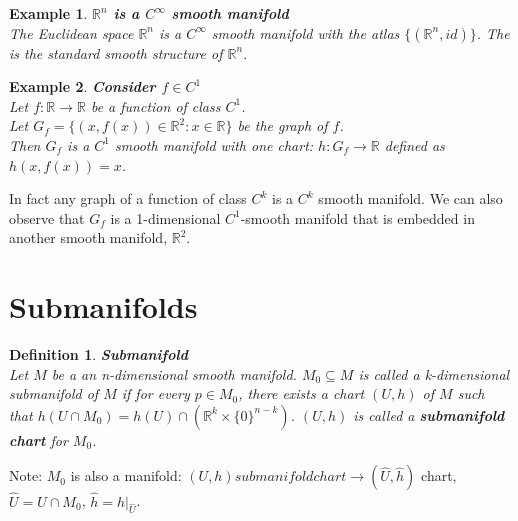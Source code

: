 \documentclass[11pt]{book} %
\newtheorem{definition}{Definition}[section]
\newtheorem*{example*}{Example}
\begin{document}
\begin{example*}{\textbf{$\mathbb{R}^n$ is a $C^{\infty}$ smooth manifold}} \\
    The Euclidean space \( \mathbb{R}^n \) is a \( C^{\infty} \) smooth manifold with the atlas \( \{ (\mathbb{R}^n, id) \} \).
    The is the standard smooth structure of \( \mathbb{R}^n \).
\end{example*}

\begin{example*}{\textbf{Consider $f \in C^1$}} \\
    Let \( f: \mathbb{R} \to \mathbb{R} \) be a function of class \( C^1 \). \\
    Let $ G_f = \{ (x, f(x)) \in \mathbb{R}^2 : x \in \mathbb{R} \} $ be the graph of \( f \). \\
    Then \( G_f \) is a \( C^1 \) smooth manifold with one chart: \( h : G_f \to \mathbb{R} \) defined as \( h(x, f(x)) = x \).
\end{example*}

In fact any graph of a function of class \( C^k \) is a \( C^k \) smooth manifold.
We can also observe that $G_f$ is a 1-dimensional $C^1$-smooth manifold that is embedded in another smooth manifold, \( \mathbb{R}^2 \).


\section{Submanifolds}

\begin{definition}{\textbf{Submanifold}} \\
    Let \( M \) be a an n-dimensional smooth manifold. 
    \( M_0 \subseteq M \) is called a k-dimensional submanifold of \( M \) if for every \( p \in M_0 \), there exists a chart \( (U, h) \) of \( M \) 
    such that \( h(U \cap M_0) = h(U) \cap (\mathbb{R}^k \times \{ 0 \}^{n-k}) \).
    \((U, h)\) is called a \textbf{submanifold chart} for \( M_0 \).
\end{definition}

Note: \( M_0 \) is also a manifold: 
\( (U, h) submanifold chart \to (\hat{U}, \hat{h}) \) chart, \( \hat{U} = U \cap M_0 \), \( \hat{h} = h|_{\hat{U}} \).
\end{document}

